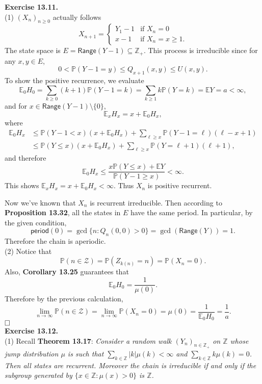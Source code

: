 \documentclass[12pt]{extarticle}
\begin{document}
\noindent
\textbf{Exercise 13.11.} \\
(1) $(X_n)_{n\geq 0}$ actually follows
\[
X_{n+1}=
\left\{
\begin{array}{ll}
Y_1-1 & \text{if }X_n=0\\
x-1 & \text{if }X_n=x\geq 1.
\end{array}
\right.
\]
The state space is $E=\mathsf{Range}(Y-1)\subseteq\mathbb{Z}_+$.
This process is irreducible since for any $x,y\in E$,
\[
0<\mathbb{P}(Y-1=y)\leq Q_{x+1}(x,y)\leq U(x,y).
\] 
To show the positive recurrence, we evaluate
\[
\mathbb{E}_0H_0=
\sum_{k\geq 0}(k+1)\mathbb{P}(Y-1=k)=\sum_{k\geq 1}k\mathbb{P}(Y=k)
=
\mathbb{E}Y=a<\infty,
\]
and for $x\in \mathsf{Range}(Y-1)\setminus\{0\}$,
\[
\mathbb{E}_xH_x=x+\mathbb{E}_0H_x,
\]
where
\[
\begin{aligned}
\mathbb{E}_0H_x
&\leq
\mathbb{P}(Y-1< x)\left(x+\mathbb{E}_0H_x\right)
+
\sum_{\ell\geq x}\mathbb{P}(Y-1=\ell)(\ell-x+1) \\&
\leq
\mathbb{P}(Y\leq x)\left(x+\mathbb{E}_0H_x\right)
+
\sum_{\ell\geq x}\mathbb{P}(Y=\ell+1)(\ell+1),
\end{aligned}
\]
and therefore
\[
\mathbb{E}_0H_x\leq\frac{x\mathbb{P}(Y\leq x)+\mathbb{E}Y}{\mathbb{P}(Y-1\geq x)}<\infty.
\]
This shows $\mathbb{E}_xH_x=x+\mathbb{E}_0H_x<\infty$.
Thus $X_n$ is positive recurrent.

Now we've known that $X_n$ is recurrent irreducible. Then according to \textbf{Proposition 13.32}, all the states in $E$ have the same period.
In particular,
by the given condition,
\[
\mathsf{period}(0)=
\gcd\{n:Q_n(0,0)>0\}=\gcd\left(\mathsf{Range}(Y)\right)=1.
\]
Therefore the chain is aperiodic. \\

\noindent
(2)
Notice that
\[
\mathbb{P}(n\in\mathcal{Z})
=
\mathbb{P}(Z_{k(n)}=n)
=
\mathbb{P}(X_n=0).
\]
Also, \textbf{Corollary 13.25} guarantees that
\[
\mathbb{E}_0H_0=\frac{1}{\mu(0)}.
\]
Therefore by the previous calculation,
\[
\lim_{n\rightarrow\infty}\mathbb{P}(n\in\mathcal{Z})
=
\lim_{n\rightarrow\infty}\mathbb{P}
(X_n=0)
=
\mu(0)
=\frac{1}{\mathbb{E}_0H_0}
=\frac{1}{a}.
\]
$\hspace{\fill}\square$ \\

\noindent
\textbf{Exercise 13.12.} \\
(1) Recall \textbf{Theorem 13.17}: \textit{Consider a random walk 
$(Y_n)_{n\in\mathbb{Z}_{+}}$ on $\mathbb{Z}$ whose jump distribution $\mu$ is such that 	
$\sum_{k\in\mathbb{Z}} |k|\mu(k)<\infty$ and $\sum_{k\in\mathbb{Z}}k\mu(k)=0$.
Then all states are recurrent.
Moreover the chain is irreducible if and only if the subgroup generated by $\{x\in\mathbb{Z}:\mu(x)>0\}$ is $\mathbb{Z}$.}
\end{document}

